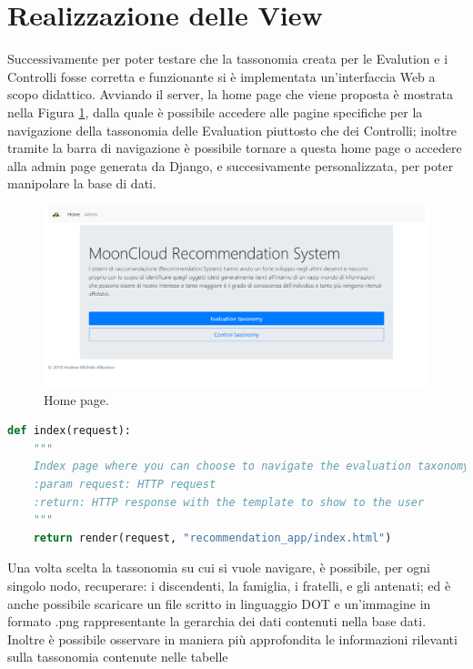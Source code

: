 \section*{Realizzazione delle View}
Successivamente per poter testare che la tassonomia creata per le Evalution e i Controlli fosse corretta e funzionante si è 
implementata un'interfaccia Web a scopo didattico.
Avviando il server, la home page che viene proposta è mostrata nella Figura \ref{fig:MCRS_homepage}, dalla quale è possibile 
accedere alle pagine specifiche per la navigazione della tassonomia delle Evaluation piuttosto che dei Controlli; inoltre 
tramite la barra di navigazione è possibile tornare a questa home page o accedere alla admin page generata da Django, e 
succesivamente personalizzata, per poter manipolare la base di dati.
%
\begin{figure}[ht!]
    \includegraphics[scale=0.3]{images/MCRS_homepage.png}
    \caption{Home page.}
    \label{fig:MCRS_homepage}
\end{figure}
\lstset{style=python_code_style}
\begin{lstlisting}[language=Python, label=lst:view_homepage, caption={Parte principale del codice delle View della soluzione per gestire l'accesso 
    alla home page.}]
def index(request):
    """
    Index page where you can choose to navigate the evaluation taxonomy or the control taxonomy.
    :param request: HTTP request
    :return: HTTP response with the template to show to the user
    """
    return render(request, "recommendation_app/index.html")
\end{lstlisting}
%
Una volta scelta la tassonomia su cui si vuole navigare, è possibile, per ogni singolo nodo, recuperare: i 
discendenti, la famiglia, i fratelli, e gli antenati; ed è anche possibile scaricare un file scritto in linguaggio 
DOT e un'immagine in formato .png rappresentante la gerarchia dei dati contenuti nella base dati.
Inoltre è possibile osservare in maniera più approfondita le informazioni rilevanti sulla tassonomia contenute nelle tabelle 
